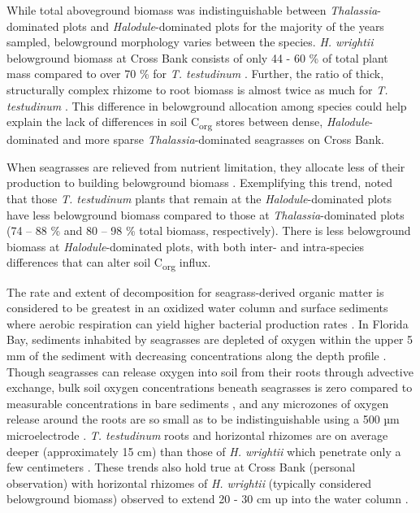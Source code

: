 	While total aboveground biomass was indistinguishable between \textit{Thalassia}-dominated plots and \textit{Halodule}-dominated plots for the majority of the years sampled, belowground morphology varies between the species. \textit{H. wrightii} belowground biomass at Cross Bank consists of only 44 - 60 \% of total plant mass compared to over 70 \% for \textit{T. testudinum} \citep{Powell:1989tt}. Further, the ratio of thick, structurally complex rhizome to root biomass is almost twice as much for \textit{T. testudinum} \citep{Duarte:1998uz}. This difference in belowground allocation among species could help explain the lack of differences in soil C\textsubscript{org} stores between dense, \textit{Halodule}-dominated and more sparse \textit{Thalassia}-dominated seagrasses on Cross Bank.

	When seagrasses are relieved from nutrient limitation, they allocate less of their production to building belowground biomass \citep{Gleeson:1993wj, Lee:2000cn}. Exemplifying this trend, \citet{Powell:1989tt} noted that those \textit{T. testudinum} plants that remain at the \textit{Halodule}-dominated plots have less belowground biomass compared to those at \textit{Thalassia}-dominated plots (74 – 88 \% and 80 – 98 \% total biomass, respectively). There is less belowground biomass at \textit{Halodule}-dominated plots, with both inter- and intra-species differences that can alter soil C\textsubscript{org} influx.

	The rate and extent of decomposition for seagrass-derived organic matter is considered to be greatest in an oxidized water column and surface sediments where aerobic respiration can yield higher bacterial production rates \citep{Harrison:1989tp, Arndt:2013bc}. In Florida Bay, sediments inhabited by seagrasses are depleted of oxygen within the upper 5 mm of the sediment with decreasing concentrations along the depth profile \citep{Borum:2005if}. Though seagrasses can release oxygen into soil from their roots through advective exchange, bulk soil oxygen concentrations beneath seagrasses is zero compared to measurable concentrations in bare sediments \citep{Burdige:2002to, Holmer:2009tj}, and any microzones of oxygen release around the roots are so small as to be indistinguishable using a 500 µm microelectrode \citep{Borum:2005if}. \textit{T. testudinum} roots and horizontal rhizomes are on average deeper (approximately 15 cm) than those of \textit{H. wrightii} which penetrate only a few centimeters \citep{Duarte:1998uz}. These trends also hold true at Cross Bank (personal observation) with horizontal rhizomes of \textit{H. wrightii} (typically considered belowground biomass) observed to extend 20 - 30 cm up into the water column \citep{Fourqurean:1995uj}.

